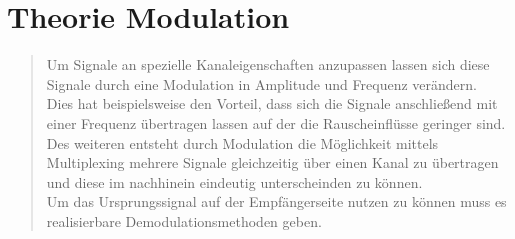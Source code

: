 \section{Theorie Modulation}
\begin{quote}
        Um Signale an spezielle Kanaleigenschaften anzupassen lassen sich diese Signale durch eine Modulation in
        Amplitude und Frequenz verändern.\\
        Dies hat beispielsweise den Vorteil, dass sich die Signale anschließend mit einer Frequenz
        übertragen lassen auf der die Rauscheinflüsse geringer sind. Des weiteren entsteht durch Modulation die
        Möglichkeit mittels Multiplexing mehrere Signale gleichzeitig über einen Kanal zu übertragen und diese im
        nachhinein eindeutig unterscheinden zu können.\\
        Um das Ursprungssignal auf der Empfängerseite nutzen zu können muss es realisierbare Demodulationsmethoden
        geben.
\end{quote}


